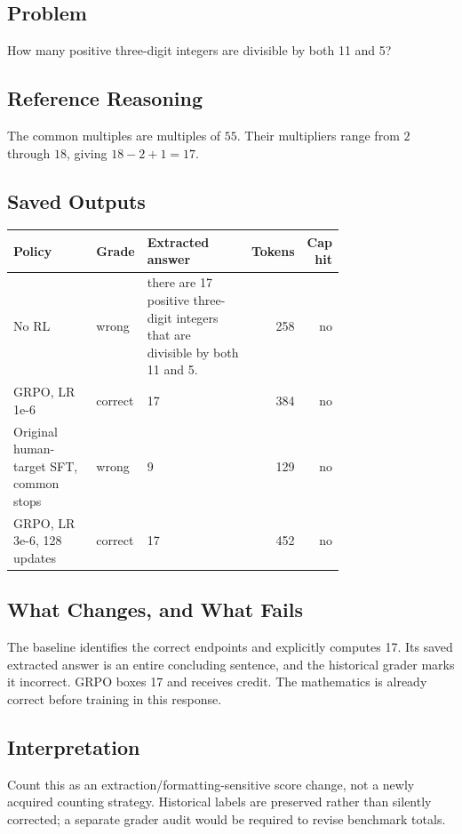 \documentclass[10pt,letterpaper]{article}
\begin{document}
\subsection*{Problem}
How many positive three-digit integers are divisible by both 11 and 5?
\subsection*{Reference Reasoning}
The common multiples are multiples of $55$. Their multipliers range from $2$ through $18$, giving $18-2+1=17$.
\subsection*{Saved Outputs}
\small\begin{longtable}{p{0.29\linewidth}p{0.10\linewidth}p{0.35\linewidth}rr}\toprule Policy & Grade & Extracted answer & Tokens & Cap hit\\\midrule
No RL & wrong & there are 17 positive three-digit integers that are divisible by both 11 and 5. & 258 & no\\
GRPO, LR 1e-6 & correct & 17 & 384 & no\\
Original human-target SFT, common stops & wrong & 9 & 129 & no\\
GRPO, LR 3e-6, 128 updates & correct & 17 & 452 & no\\
\bottomrule\end{longtable}\normalsize
\subsection*{What Changes, and What Fails}
The baseline identifies the correct endpoints and explicitly computes 17. Its saved extracted answer is an entire concluding sentence, and the historical grader marks it incorrect. GRPO boxes 17 and receives credit. The mathematics is already correct before training in this response.
\subsection*{Interpretation}
Count this as an extraction/formatting-sensitive score change, not a newly acquired counting strategy. Historical labels are preserved rather than silently corrected; a separate grader audit would be required to revise benchmark totals.
\end{document}
